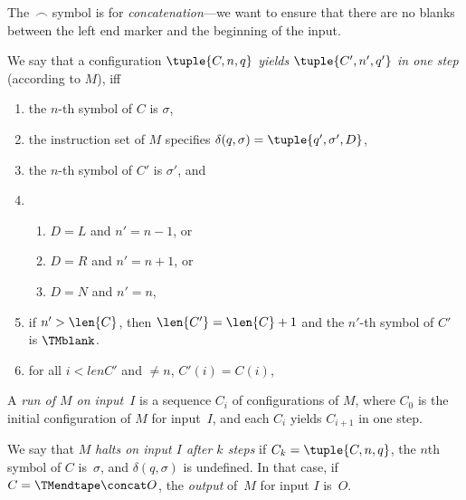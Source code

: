 \documentclass[../../../include/open-logic-section]{subfiles}
\begin{document}
\begin{explain}
The~$\frown$ symbol is for \emph{concatenation}---we want to
ensure that there are no blanks between the left end marker and
the beginning of the input.
\end{explain}

\begin{defn}
We say that a configuration $\tuple{C, n, q}$ \emph{yields
  $\tuple{C', n', q'}$ in one step} (according to $M$), iff
\begin{enumerate}
\item the $n$-th symbol of $C$ is $\sigma$,
\item the instruction set of $M$ specifies $\delta(q, \sigma) =
  \tuple{q', \sigma', D}$,
\item the $n$-th symbol of $C'$ is $\sigma'$, and 
\item
\begin{enumerate}
\item $D = L$ and $n' = n - 1$, or
\item $D = R$ and $n' = n + 1$, or
\item $D = N$ and $n' = n$,
\end{enumerate}
\item if $n' > \len{C}$, then $\len{C'} = \len{C} + 1$ and the $n'$-th
  symbol of $C'$ is $\TMblank$.
\item for all $i < len{C'}$ and $\neq n$, $C'(i) = C(i)$,
\end{enumerate}
\end{defn}

\begin{defn}
A \emph{run of $M$ on input~$I$} is a sequence $C_i$ of configurations
of $M$, where $C_0$ is the initial configuration of $M$ for input~$I$,
and each $C_i$ yields $C_{i+1}$ in one step.

We say that $M$ \emph{halts on input $I$ after $k$ steps} if $C_k =
\tuple{C, n, q}$, the $n$th symbol of $C$ is~$\sigma$, and $\delta(q,
\sigma)$ is undefined.  In that case, if $C = \TMendtape \concat O$,
the \emph{output} of~$M$ for input $I$ is~$O$.
\end{defn}
\end{document}
